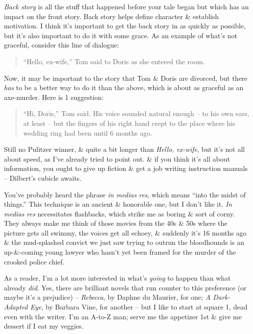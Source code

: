 \documentclass{article}
\numberwithin{equation}{section}
\begin{document}
\textit{Back story} is all the stuff that happened before your tale began but which has an impact on the front story. Back story helps define character \& establish motivation. I think it's important to get the back story in as quickly as possible, but it's also important to do it with some grace. As an example of what's not graceful, consider this line of dialogue:
\begin{quotation}
	``Hello, ex-wife,'' Tom said to Doris as she entered the room.
\end{quotation}
Now, it may be important to the story that Tom \& Doris are divorced, but there \textit{has} to be a better way to do it than the above, which is about as graceful as an axe-murder. Here is 1 suggestion:
\begin{quotation}
	``Hi, Doris,'' Tom said. His voice sounded natural enough -- to his own ears, at least -- but the fingers of his right hand crept to the place where his wedding ring had been until 6 months ago.
\end{quotation}
Still no Pulitzer winner, \& quite a bit longer than \textit{Hello, ex-wife}, but it's not all about speed, as I've already tried to point out. \& if you think it's all about information, you ought to give up fiction \& get a job writing instruction manuals -- Dilbert's cubicle awaits.

You've probably heard the phrase \textit{in medias res}, which means ``into the midst of things.'' This technique is an ancient \& honorable one, but I don't like it. \textit{In medias res} necessitates flashbacks, which strike me as boring \& sort of corny. They always make me think of those movies from the 40s \& 50s where the picture gets all swimmy, the voices get all echoey, \& suddenly it's 16 months ago \& the mud-splashed convict we just saw trying to outrun the bloodhounds is an up-\&-coming young lawyer who hasn't yet been framed for the murder of the crooked police chief.

As a reader, I'm a lot more interested in what's \textit{going} to happen than what already \textit{did}. Yes, there are brilliant novels that run counter to this preference (or maybe it's a prejudice) -- \textit{Rebecca}, by Daphne du Maurier, for one; \textit{A Dark-Adapted Eye}, by Barbara Vine, for another -- but I like to start at square 1, dead even with the writer. I'm an A-to-Z man; serve me the appetizer 1st \& give me dessert if I eat my veggies.
\end{document}
